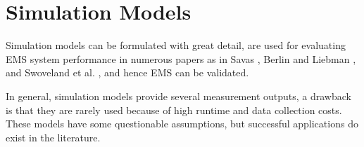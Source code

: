 \section{Simulation Models}

Simulation models
can be formulated with great detail,
are used for evaluating EMS system performance in numerous papers
as in Savas \cite{savas1969simulation},
Berlin and Liebman \cite{berlin1974mathematical},
and Swoveland et al. \cite{swoveland1973simulation},
and hence
EMS can be validated.

In general,
simulation models provide
several measurement outputs,
a drawback is that
they are rarely used
because of high runtime and data collection costs.
These models have some questionable assumptions,
but successful applications do exist in the literature.
